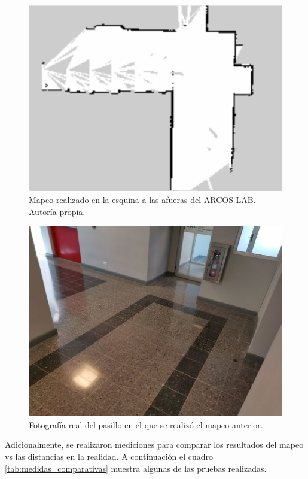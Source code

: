 \begin{figure}
\centering
\includegraphics[scale=0.5]{imagenes/mapeo_esquina.png}
\caption{Mapeo realizado en la esquina a las afueras del ARCOS-LAB. Autoría propia.}
\end{figure}

\begin{figure}
\centering
\includegraphics[scale=0.5]{imagenes/afueras_arcoslab.jpg}
\caption{Fotografía real del pasillo en el que se realizó el mapeo anterior.}
\end{figure}

Adicionalmente, se realizaron mediciones para comparar los resultados del mapeo vs las distancias en la realidad. A continuación el cuadro \ref{tab:medidas_comparativas} muestra algunas de las pruebas realizadas.

